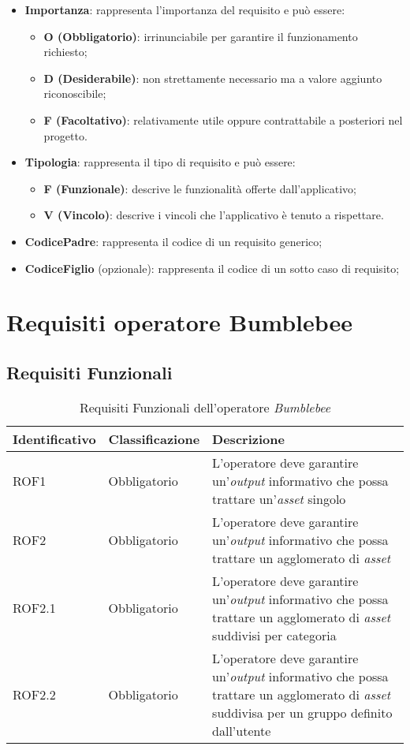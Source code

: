 \begin{itemize}
\item {\textbf{Importanza}: rappresenta l'importanza del requisito e può essere:
	\begin{itemize}
	\item {\textbf{O (Obbligatorio)}: irrinunciabile per garantire il funzionamento richiesto;}
	\item {\textbf{D (Desiderabile)}: non strettamente necessario ma a valore aggiunto riconoscibile;}
	\item {\textbf{F (Facoltativo)}: relativamente utile oppure contrattabile a posteriori nel progetto.}
	\end{itemize}
}
\item{\textbf{Tipologia}: rappresenta il tipo di requisito e può essere:
\begin{itemize}
\item \textbf{F (Funzionale)}: descrive le funzionalità  offerte dall'applicativo;
\item \textbf{V (Vincolo)}: descrive i vincoli che l'applicativo è tenuto a rispettare.
\end{itemize}}
\item \textbf{CodicePadre}: rappresenta il codice di un requisito generico;
\item \textbf{CodiceFiglio} (opzionale): rappresenta il codice di un sotto caso di requisito;
\end{itemize}


\section{Requisiti operatore Bumblebee}
\subsection{Requisiti Funzionali}
{
\centering
\begin{longtable}{L{3cm} L{3cm} L{7.5cm}}
\caption{Requisiti Funzionali dell'operatore \textit{Bumblebee}}\\
\textbf{Identificativo} &
\textbf{Classificazione}&
\textbf{Descrizione}\\
\endhead
\hline

ROF1 & Obbligatorio & L'operatore deve garantire un'\textit{output} informativo che possa trattare un'\textit{asset} singolo\\
\hline
ROF2 & Obbligatorio & L'operatore deve garantire un'\textit{output} informativo che possa trattare un agglomerato di \textit{asset}\\
\hline
ROF2.1 & Obbligatorio & L'operatore deve garantire un'\textit{output} informativo che possa trattare un agglomerato di \textit{asset} suddivisi per categoria\\
\hline
ROF2.2 & Obbligatorio & L'operatore deve garantire un'\textit{output} informativo che possa trattare un agglomerato di \textit{asset} suddivisa per un gruppo definito dall'utente\\
\hline
\end{longtable}
}


